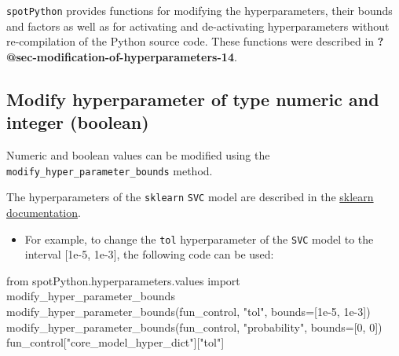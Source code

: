 \documentclass[
  letterpaper,
  DIV=11,
  numbers=noendperiod]{scrreprt}
\newenvironment{Shaded}{\begin{snugshade}}{\end{snugshade}}
\newcommand{\DecValTok}[1]{\textcolor[rgb]{0.68,0.00,0.00}{#1}}
\newcommand{\FloatTok}[1]{\textcolor[rgb]{0.68,0.00,0.00}{#1}}
\newcommand{\ImportTok}[1]{\textcolor[rgb]{0.00,0.46,0.62}{#1}}
\newcommand{\NormalTok}[1]{\textcolor[rgb]{0.00,0.23,0.31}{#1}}
\newcommand{\OperatorTok}[1]{\textcolor[rgb]{0.37,0.37,0.37}{#1}}
\newcommand{\StringTok}[1]{\textcolor[rgb]{0.13,0.47,0.30}{#1}}
\providecommand{\tightlist}{%
  \setlength{\itemsep}{0pt}\setlength{\parskip}{0pt}}\usepackage{longtable,booktabs,array}
\begin{document}
\texttt{spotPython} provides functions for modifying the
hyperparameters, their bounds and factors as well as for activating and
de-activating hyperparameters without re-compilation of the Python
source code. These functions were described in
\textbf{?@sec-modification-of-hyperparameters-14}.

\hypertarget{modify-hyperparameter-of-type-numeric-and-integer-boolean}{%
\subsection{Modify hyperparameter of type numeric and integer
(boolean)}\label{modify-hyperparameter-of-type-numeric-and-integer-boolean}}

Numeric and boolean values can be modified using the
\texttt{modify\_hyper\_parameter\_bounds} method.

\begin{tcolorbox}[enhanced jigsaw, left=2mm, toprule=.15mm, colframe=quarto-callout-note-color-frame, leftrule=.75mm, title=\textcolor{quarto-callout-note-color}{\faInfo}\hspace{0.5em}{\texttt{sklearn\ Model} Hyperparameters}, toptitle=1mm, opacitybacktitle=0.6, arc=.35mm, titlerule=0mm, opacityback=0, bottomtitle=1mm, coltitle=black, rightrule=.15mm, colback=white, colbacktitle=quarto-callout-note-color!10!white, breakable, bottomrule=.15mm]

The hyperparameters of the \texttt{sklearn} \texttt{SVC} model are
described in the
\href{https://scikit-learn.org/stable/modules/generated/sklearn.svm.SVC.html}{sklearn
documentation}.

\end{tcolorbox}

\begin{itemize}
\tightlist
\item
  For example, to change the \texttt{tol} hyperparameter of the
  \texttt{SVC} model to the interval {[}1e-5, 1e-3{]}, the following
  code can be used:
\end{itemize}

\begin{Shaded}
\begin{Highlighting}[]
\ImportTok{from}\NormalTok{ spotPython.hyperparameters.values }\ImportTok{import}\NormalTok{ modify\_hyper\_parameter\_bounds}
\NormalTok{modify\_hyper\_parameter\_bounds(fun\_control, }\StringTok{"tol"}\NormalTok{, bounds}\OperatorTok{=}\NormalTok{[}\FloatTok{1e{-}5}\NormalTok{, }\FloatTok{1e{-}3}\NormalTok{])}
\NormalTok{modify\_hyper\_parameter\_bounds(fun\_control, }\StringTok{"probability"}\NormalTok{, bounds}\OperatorTok{=}\NormalTok{[}\DecValTok{0}\NormalTok{, }\DecValTok{0}\NormalTok{])}
\NormalTok{fun\_control[}\StringTok{"core\_model\_hyper\_dict"}\NormalTok{][}\StringTok{"tol"}\NormalTok{]}
\end{Highlighting}
\end{Shaded}
\end{document}

